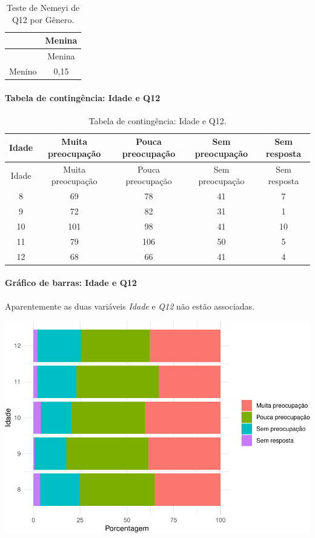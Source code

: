 \documentclass[]{article}
\let\oldparagraph\paragraph
\renewcommand{\paragraph}[1]{\oldparagraph{#1}\mbox{}}
\begin{document}
\begin{longtable}[]{@{}lc@{}}
\caption{\label{tab:unnamed-chunk-30}Teste de Nemeyi de Q12 por Gênero.}\tabularnewline
\toprule
& Menina\tabularnewline
\midrule
\endfirsthead
\toprule
& Menina\tabularnewline
\midrule
\endhead
Menino & 0,15\tabularnewline
\bottomrule
\end{longtable}

\cleardoublepage

\hypertarget{tabela-de-continguxeancia-idade-e-q12}{%
\paragraph{Tabela de contingência: Idade e Q12}\label{tabela-de-continguxeancia-idade-e-q12}}

\begin{longtable}[]{@{}ccccc@{}}
\caption{\label{tab:unnamed-chunk-31}Tabela de contingência: Idade e Q12.}\tabularnewline
\toprule
Idade & Muita preocupação & Pouca preocupação & Sem preocupação & Sem resposta\tabularnewline
\midrule
\endfirsthead
\toprule
Idade & Muita preocupação & Pouca preocupação & Sem preocupação & Sem resposta\tabularnewline
\midrule
\endhead
8 & 69 & 78 & 41 & 7\tabularnewline
9 & 72 & 82 & 31 & 1\tabularnewline
10 & 101 & 98 & 41 & 10\tabularnewline
11 & 79 & 106 & 50 & 5\tabularnewline
12 & 68 & 66 & 41 & 4\tabularnewline
\bottomrule
\end{longtable}

\hypertarget{gruxe1fico-de-barras-idade-e-q12}{%
\paragraph{Gráfico de barras: Idade e Q12}\label{gruxe1fico-de-barras-idade-e-q12}}

Aparentemente as duas variáveis \emph{Idade} e \emph{Q12} não estão associadas.

\begin{center}\includegraphics[width=0.75\linewidth]{relatorio_files/figure-latex/unnamed-chunk-32-1} \end{center}
\end{document}
